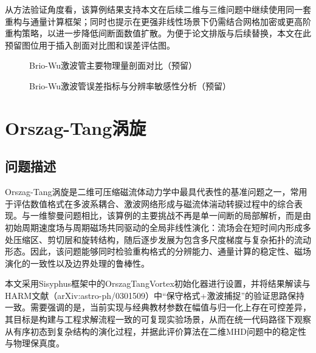 从方法验证角度看，该算例结果支持本文在后续二维与三维问题中继续使用同一套重构与通量计算框架；同时也提示在更强非线性场景下仍需结合网格加密或更高阶重构策略，以进一步降低间断面数值扩散。为便于论文排版与后续替换，本文在此预留图位用于插入剖面对比图和误差评估图。

\begin{figure}[htbp]
	\centering
	\caption{Brio-Wu激波管主要物理量剖面对比（预留）}
	\label{fig:brio-wu-profile-placeholder}
\end{figure}

\begin{figure}[htbp]
	\centering
	\caption{Brio-Wu激波管误差指标与分辨率敏感性分析（预留）}
	\label{fig:brio-wu-error-placeholder}
\end{figure}

\section{Orszag-Tang涡旋}
\subsection{问题描述}
Orszag-Tang涡旋是二维可压缩磁流体动力学中最具代表性的基准问题之一，常用于评估数值格式在多波系耦合、激波网络形成与磁流体湍动转捩过程中的综合表现。与一维黎曼问题相比，该算例的主要挑战不再是单一间断的局部解析，而是由初始周期速度场与周期磁场共同驱动的全局非线性演化：流场会在短时间内形成多处压缩区、剪切层和旋转结构，随后逐步发展为包含多尺度梯度与复杂拓扑的流动形态。因此，该问题能够同时检验重构格式的分辨能力、通量计算的稳定性、磁场演化的一致性以及边界处理的鲁棒性。

本文采用Sisyphus框架中的OrszagTangVortex初始化器进行设置，并将结果解读与HARM文献（arXiv:astro-ph/0301509）中“保守格式+激波捕捉”的验证思路保持一致。需要强调的是，当前实现与经典教材参数在幅值与归一化上存在可控差异，其目标是构建与工程求解流程一致的可复现实验场景，从而在统一代码路径下观察从有序初态到复杂结构的演化过程，并据此评价算法在二维MHD问题中的稳定性与物理保真度。

